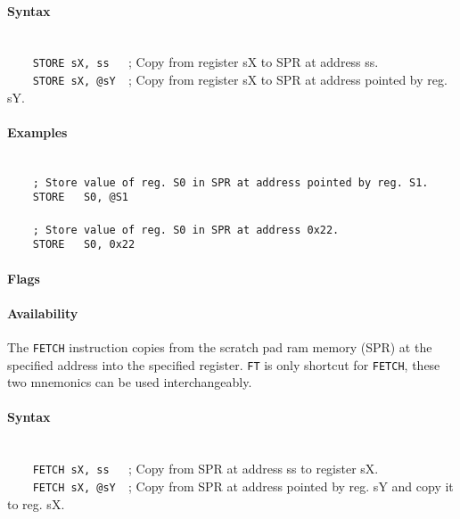         \paragraph{Syntax}
            ~\\
            \verb'    STORE sX, ss   '; Copy from register sX to SPR at address ss.\\
            \verb'    STORE sX, @sY  '; Copy from register sX to SPR at address pointed by reg. sY.

        \paragraph{Examples}
            ~\\
            \verb'    ; Store value of reg. S0 in SPR at address pointed by reg. S1.'\\
            \verb'    STORE   S0, @S1'\\
            \verb''\\
            \verb'    ; Store value of reg. S0 in SPR at address 0x22.'\\
            \verb'    STORE   S0, 0x22'

        \paragraph{Flags}

        \paragraph{Availability}
            \pbavailability{\yes}{\yes}{\no}{\no}{\no}

    \clearpage
        The \texttt{FETCH} instruction copies from the scratch pad ram memory (SPR) at the specified address into the specified register. \texttt{FT} is only shortcut for \texttt{FETCH}, these two mnemonics can be used interchangeably.

        \paragraph{Syntax}
            ~\\
            \verb'    FETCH sX, ss   '; Copy from SPR at address ss to register sX.\\
            \verb'    FETCH sX, @sY  '; Copy from SPR at address pointed by reg. sY and copy it to reg. sX.

